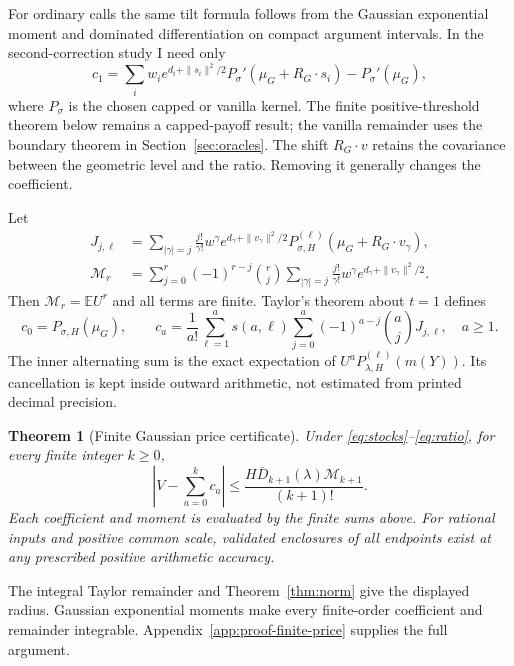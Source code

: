 \documentclass[11pt]{article}
\newtheorem{theorem}{Theorem}[section]
\newcommand{\E}{\mathbb E}
\begin{document}
For ordinary calls the same tilt formula follows from the Gaussian
exponential moment and dominated differentiation on compact argument
intervals. In the second-correction study I need only
\begin{equation}
 c_1=\sum_iw_i e^{d_i+\|s_i\|^2/2}
 P_\sigma'(\mu_G+R_G\cdot s_i)-P_\sigma'(\mu_G),
\end{equation}
where $P_\sigma$ is the chosen capped or vanilla kernel.
The finite positive-threshold theorem below remains a capped-payoff result;
the vanilla remainder uses the boundary theorem in Section~\ref{sec:oracles}.
The shift $R_G\cdot v$ retains the covariance between the geometric level
and the ratio.  Removing it generally changes the coefficient.

Let
\begin{align}
 J_{j,\ell}&=\sum_{|\gamma|=j}\frac{j!}{\gamma!}w^\gamma
 e^{d_\gamma+\|v_\gamma\|^2/2}
 P_{\sigma,H}^{(\ell)}(\mu_G+R_G\cdot v_\gamma),\label{eq:J}\\
 \mathcal M_r&=\sum_{j=0}^r(-1)^{r-j}\binom rj
 \sum_{|\gamma|=j}\frac{j!}{\gamma!}w^\gamma
 e^{d_\gamma+\|v_\gamma\|^2/2}.
 \label{eq:continuous-moments}
\end{align}
Then $\mathcal M_r=\E U^r$ and all terms are finite.
Taylor's theorem about $t=1$ defines
\begin{equation}
 c_0=P_{\sigma,H}(\mu_G),\qquad
 c_a=\frac1{a!}\sum_{\ell=1}^as(a,\ell)
        \sum_{j=0}^a(-1)^{a-j}\binom ajJ_{j,\ell},\quad a\geq1.
 \label{eq:coefficients}
\end{equation}
The inner alternating sum is the exact expectation of
$U^aP_{\lambda,H}^{(\ell)}(m(Y))$.
Its cancellation is kept inside outward arithmetic, not estimated from
printed decimal precision.

\begin{theorem}[Finite Gaussian price certificate]
\label{thm:finite-price}
Under \eqref{eq:stocks}--\eqref{eq:ratio}, for every finite integer $k\geq0$,
\begin{equation}
 \left|V-\sum_{a=0}^kc_a\right|
 \leq\frac{H\overline D_{k+1}(\lambda)\mathcal M_{k+1}}{(k+1)!}.
 \label{eq:finite-certificate}
\end{equation}
Each coefficient and moment is evaluated by the finite sums above.
For rational inputs and positive common scale, validated enclosures of all
endpoints exist at any prescribed positive arithmetic accuracy.
\end{theorem}
The integral Taylor remainder and Theorem~\ref{thm:norm} give the displayed radius. Gaussian exponential moments make every finite-order coefficient and remainder integrable. Appendix~\ref{app:proof-finite-price} supplies the full argument.
\end{document}

